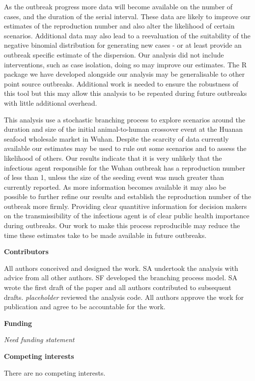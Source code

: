 \documentclass[]{article}
\begin{document}
As the outbreak progress more data will become available on the number
of cases, and the duration of the serial interval. These data are likely
to improve our estimates of the reproduction number and also alter the
likelihood of certain scenarios. Additional data may also lead to a
reevaluation of the suitability of the negative binomial distribution
for generating new cases - or at least provide an outbreak specific
estimate of the dispersion. Our analysis did not include interventions,
such as case isolation, doing so may improve our estimates. The R
package we have developed alongside our analysis may be generalisable to
other point source outbreaks. Additional work is needed to ensure the
robustness of this tool but this may allow this analysis to be repeated
during future outbreaks with little additional overhead.

This analysis use a stochastic branching process to explore scenarios
around the duration and size of the initial animal-to-human crossover
event at the Huanan seafood wholesale market in Wuhan. Despite the
scarcity of data currently available our estimates may be used to rule
out some scenarios and to assess the likelihood of others. Our results
indicate that it is very unlikely that the infectious agent responsible
for the Wuhan outbreak has a reproduction number of less than 1, unless
the size of the seeding event was much greater than currently reported.
As more information becomes available it may also be possible to further
refine our results and establish the reproduction number of the outbreak
more firmly. Providing clear quantitive information for decision makers
on the transmissibility of the infectious agent is of clear public
health importance during outbreaks. Our work to make this process
reproducible may reduce the time these estimates take to be made
available in future outbreaks.

\textbf{Contributors}

All authors conceived and designed the work. SA undertook the analysis
with advice from all other authors. SF developed the branching process
model. SA wrote the first draft of the paper and all authors contributed
to subsequent drafts. \emph{placeholder} reviewed the analysis code. All
authors approve the work for publication and agree to be accountable for
the work.

\textbf{Funding}

\emph{Need funding statement}

\textbf{Competing interests}

There are no competing interests.
\end{document}
